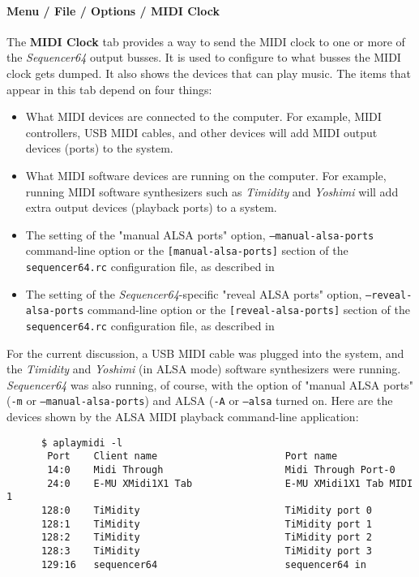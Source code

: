 \paragraph{Menu / File / Options / MIDI Clock}
\label{paragraph:seq64_menu_file_options_midi_clock}

   The \textbf{MIDI Clock} tab provides a way to send the MIDI clock to one
   or more of the \textsl{Sequencer64} output busses.
   It is used to configure to what busses the MIDI clock gets dumped.
   It also shows the devices that can play music.
   The items that appear in this tab depend on four things:

   \begin{itemize}
      \item What MIDI devices are connected to the computer.  For example,
         MIDI controllers, USB MIDI cables, and other devices will add MIDI
         output devices (ports) to the system.
      \item What MIDI software devices are running on the computer.
         For example, running MIDI software synthesizers such as
         \textsl{Timidity} and \textsl{Yoshimi} will add extra output devices
         (playback ports) to a system.
      \item The setting of the "manual ALSA ports" option,
         \texttt{--manual-alsa-ports} command-line option or the
         \texttt{[manual-alsa-ports]} section of the
         \texttt{sequencer64.rc} configuration file, as described in
      \item The setting of the \textsl{Sequencer64}-specific
         "reveal ALSA ports" option,
         \texttt{--reveal-alsa-ports} command-line option or the
         \texttt{[reveal-alsa-ports]} section of the
         \texttt{sequencer64.rc} configuration file, as described in
   \end{itemize}

   For the current discussion, a USB MIDI cable was plugged into the system,
   and the \textsl{Timidity} and \textsl{Yoshimi} (in ALSA mode) software
   synthesizers were running.  \textsl{Sequencer64} was also running, of
   course, with the option of "manual ALSA ports" (\texttt{-m} or
   \texttt{--manual-alsa-ports}) and ALSA (\texttt{-A} or
   \texttt{--alsa} turned on.
   Here are the devices shown by the ALSA MIDI playback
   command-line application:

   \begin{verbatim}
      $ aplaymidi -l
       Port    Client name                      Port name
       14:0    Midi Through                     Midi Through Port-0
       24:0    E-MU XMidi1X1 Tab                E-MU XMidi1X1 Tab MIDI 1
      128:0    TiMidity                         TiMidity port 0
      128:1    TiMidity                         TiMidity port 1
      128:2    TiMidity                         TiMidity port 2
      128:3    TiMidity                         TiMidity port 3
      129:16   sequencer64                      sequencer64 in
   \end{verbatim}


